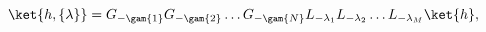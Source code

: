 \begin{equation}
%
\ket{{h,\{\lambda\}}} =
G_{-\gam{1}} G_{-\gam{2}} \ldots G_{-\gam{N}} L_{-\lambda_1} L_{-\lambda_2} \ldots L_{-\lambda_M} \ket{h},
%
\end{equation}

